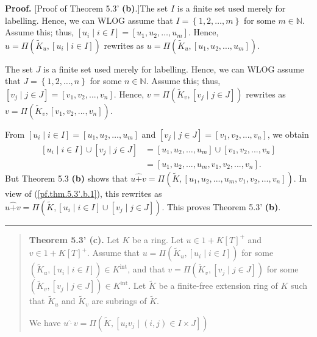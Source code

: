 \documentclass[numbers=enddot,12pt,final,onecolumn,notitlepage]{scrartcl}%
\newenvironment{proof}[1][Proof]{\noindent\textbf{#1.} }{\ \rule{0.5em}{0.5em}}
\begin{document}
\begin{proof}
[Proof of Theorem 5.3' \textbf{(b)}.]The set $I$ is a finite set used merely
for labelling. Hence, we can WLOG assume that $I=\left\{  1,2,\ldots
,m\right\}  $ for some $m\in\mathbb{N}$. Assume this; thus, $\left[  u_{i}\mid
i\in I\right]  =\left[  u_{1},u_{2},\ldots,u_{m}\right]  $. Hence,
$u=\Pi\left(  \widetilde{K}_{u},\left[  u_{i}\mid i\in I\right]  \right)  $
rewrites as \newline$u=\Pi\left(  \widetilde{K}_{u},\left[  u_{1},u_{2}%
,\ldots,u_{m}\right]  \right)  $.

The set $J$ is a finite set used merely for labelling. Hence, we can WLOG
assume that $J=\left\{  1,2,\ldots,n\right\}  $ for some $n\in\mathbb{N}$.
Assume this; thus, $\left[  v_{j}\mid j\in J\right]  =\left[  v_{1}%
,v_{2},...,v_{n}\right]  $. Hence, $v=\Pi\left(  \widetilde{K}_{v},\left[
v_{j}\mid j\in J\right]  \right)  $ rewrites as $v=\Pi\left(  \widetilde{K}%
_{v},\left[  v_{1},v_{2},...,v_{n}\right]  \right)  $.

From $\left[  u_{i}\mid i\in I\right]  =\left[  u_{1},u_{2},\ldots
,u_{m}\right]  $ and $\left[  v_{j}\mid j\in J\right]  =\left[  v_{1}%
,v_{2},...,v_{n}\right]  $, we obtain%
\begin{align}
\left[  u_{i}\mid i\in I\right]  \cup\left[  v_{j}\mid j\in J\right]   &
=\left[  u_{1},u_{2},\ldots,u_{m}\right]  \cup\left[  v_{1},v_{2}%
,...,v_{n}\right] \nonumber\\
&  =\left[  u_{1},u_{2},...,u_{m},v_{1},v_{2},...,v_{n}\right]  .
\label{pf.thm.5.3'.b.1}%
\end{align}
But Theorem 5.3 \textbf{(b)} shows that $u\widehat{+}v=\Pi\left(
\widetilde{K},\left[  u_{1},u_{2},...,u_{m},v_{1},v_{2},...,v_{n}\right]
\right)  $. In view of (\ref{pf.thm.5.3'.b.1}), this rewrites as
$u\widehat{+}v=\Pi\left(  \widetilde{K},\left[  u_{i}\mid i\in I\right]
\cup\left[  v_{j}\mid j\in J\right]  \right)  $. This proves Theorem 5.3'
\textbf{(b)}.
\end{proof}

\begin{quote}
\textbf{Theorem 5.3' (c).} Let $K$ be a ring. Let $u\in1+K\left[  T\right]
^{+}$ and $v\in1+K\left[  T\right]  ^{+}$. Assume that $u=\Pi\left(
\widetilde{K}_{u},\left[  u_{i}\mid i\in I\right]  \right)  $ for some
$\left(  \widetilde{K}_{u},\left[  u_{i}\mid i\in I\right]  \right)  \in
K^{\operatorname*{int}}$, and that $v=\Pi\left(  \widetilde{K}_{v},\left[
v_{j}\mid j\in J\right]  \right)  $ for some $\left(  \widetilde{K}%
_{v},\left[  v_{j}\mid j\in J\right]  \right)  \in K^{\operatorname*{int}}$.
Let $\widetilde{K}$ be a finite-free extension ring of $K$ such that
$\widetilde{K}_{u}$ and $\widetilde{K}_{v}$ are subrings of $\widetilde{K}$.

We have $u\widehat{\cdot}v=\Pi\left(  \widetilde{K},\left[  u_{i}v_{j}%
\mid\left(  i,j\right)  \in I\times J\right]  \right)  $
\end{quote}
\end{document}
